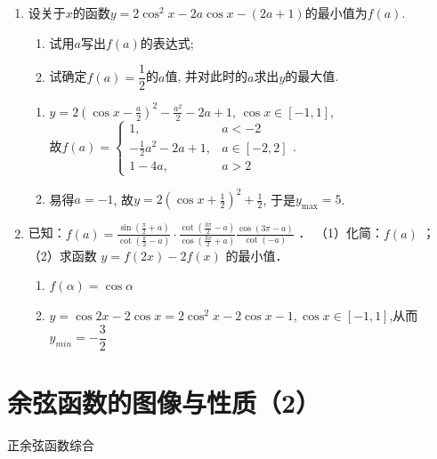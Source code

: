 \begin{enumerate}
\item 设关于$x$的函数$y=2\cos^2x-2a\cos x-(2a+1)$的最小值为$f(a)$. 
\begin{enumerate}[(1)]
\item 试用$a$写出$f(a)$的表达式; 
\item 试确定$f(a)=\dfrac{1}{2}$的$a$值, 并对此时的$a$求出$y$的最大值. 
\end{enumerate}
\begin{jieda}
\begin{enumerate}[(1)]
\item $y=2(\cos{x}-\frac{a}{2})^2-\frac{a^2}{2}-2a+1$, $\cos{x}\in[-1,1]$, \\
故$f(a)=\begin{cases}
1, & a<-2\\
-\frac{1}{2}a^2-2a+1, & a\in[-2,2]\\
1-4a, & a>2
\end{cases}$. 

\item 易得$a=-1$, 故$y=2(\cos{x}+\frac{1}{2})^2+\frac{1}{2}$, 于是$y_{\max}=5$. 
\end{enumerate}
\end{jieda}

\item 已知：$f(a)=\frac{\sin \left(\frac{\pi}{2}+a\right)}{\cot \left(\frac{\pi}{2}-a\right)} \cdot \frac{\cot \left(\frac{3 \pi}{2}-a\right)}{\cos \left(\frac{3 \pi}{2}+a\right)} \frac{\cos (3 \pi-a)}{\cot (-a)}$ ．
（1）化简：$f(a)$ ；
（2）求函数 $y=f(2 x)-2 f(x)$ 的最小值．
\begin{jieda}

\begin{enumerate}[(1)]
    \item $f(\alpha)=\cos{\alpha}$
    \item $y=\cos{2x}-2\cos{x}=2\cos^{2}{x}-2\cos{x}-1,\cos{x}\in[-1,1]$,从而$y_{min}=-\dfrac{3}{2}$
\end{enumerate}
\end{jieda}

\end{enumerate}

\section{余弦函数的图像与性质（2）}
\zsd 正余弦函数综合 \\

